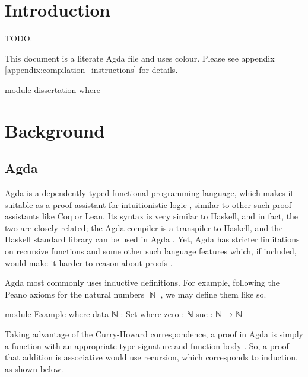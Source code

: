 \documentclass[logo,bsc,singlespacing,parskip,online]{infthesis}
\DeclareMathOperator{\nat}{\mathbb{N}}
\renewenvironment{code}{\mintedcopy[breaklines,breaksymbolleft=\;]{agda}}{\endmintedcopy}
\begin{document}
\chapter{Introduction}

TODO.

This document is a literate Agda file and uses {\color{violet}colour}. Please see appendix
\ref{appendix:compilation_instructions} for details.

\begin{code}
module dissertation where
\end{code}

\chapter{Background}

\section{Agda}
Agda is a dependently-typed functional programming language, which makes it
suitable as a proof-assistant for intuitionistic logic
\citep{norell_towards_2007}, similar to other such proof-assistants like Coq or
Lean. Its syntax is very similar to Haskell, and in fact, the two are closely
related; the Agda compiler is a transpiler to Haskell, and the Haskell standard
library can be used in Agda \citep{kusee_compiling_2017}. Yet, Agda has stricter
limitations on recursive functions and some other such language features which,
if included, would make it harder to reason about proofs
\citep{berghofer_brief_2009}.

Agda most commonly uses inductive definitions. For example, following the Peano
axioms for the natural numbers $\nat$ \citep{boolos_freges_1995}, we may define
them like so.

\begin{code}
module Example where
  data ℕ : Set where
    zero : ℕ
    suc  : ℕ → ℕ
\end{code}

Taking advantage of the Curry-Howard correspondence, a proof in Agda is simply a
function with an appropriate type signature and function body
\citep{wadler_propositions_2015}. So, a proof that addition is associative would
use recursion, which corresponds to induction, as shown below.

\begin{comment}
\begin{code}
\end{code}
\end{comment}
\end{document}
